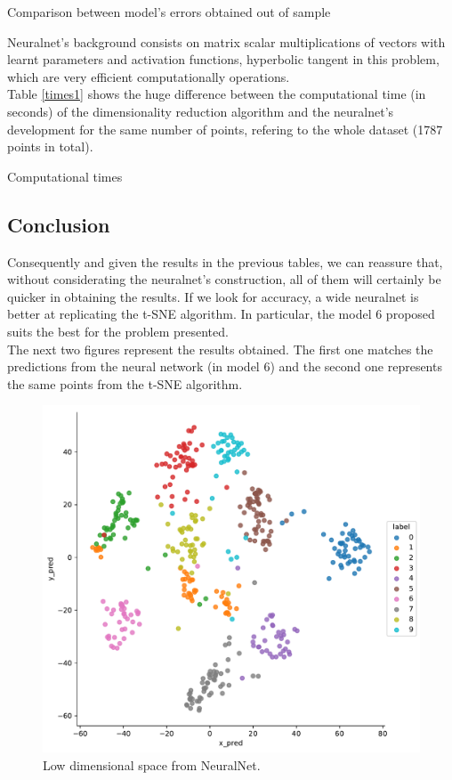 \documentclass[a4paper,11pt,spanish]{report}
\begin{document}
\begin{table}[h]
\vspace{20px}
\centering

\caption{\label{metrics1}Comparison between model's errors obtained out of sample}
\end{table}

Neuralnet's background consists on matrix scalar multiplications of vectors with learnt parameters and activation functions, hyperbolic tangent in this problem, which are very efficient computationally operations.\\
Table \ref{times1} shows the huge difference between the computational time (in seconds) of the dimensionality reduction algorithm and the neuralnet's development for the same number of points, refering to the whole dataset (1787 points in total).

\begin{table}[h]
\vspace{10px}
\centering

\caption{\label{times1}Computational times}
\end{table}

\subsection{Conclusion}
\label{ssec:conc1}

Consequently and given the results in the previous tables, we can reassure that, without considerating the neuralnet's construction, all of them will certainly be quicker in obtaining the results. If we look for accuracy, a wide neuralnet is better at replicating the t-SNE algorithm. In particular, the model 6 proposed suits the best for the problem presented.\\
The next two figures represent the results obtained. The first one matches the predictions from the neural network (in model 6) and the second one represents the same points from the t-SNE algorithm.

\begin{figure}[p]
\centering
\includegraphics[width=12cm]{figures/app1plotpredictions.pdf}
\caption{\label{figureNN}Low dimensional space from NeuralNet.}
\end{figure}
\end{document}
